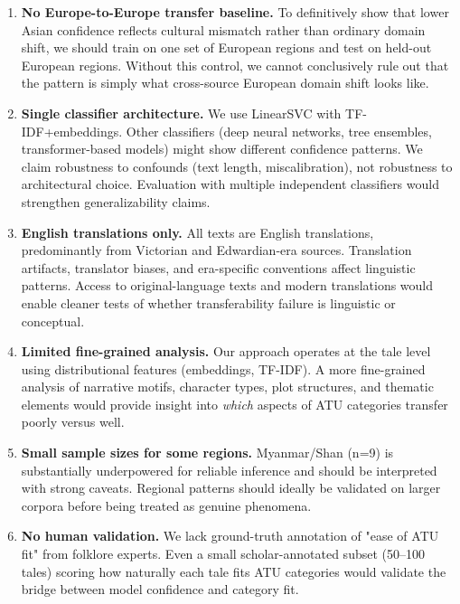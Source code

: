 \documentclass{article}
\begin{document}
\begin{enumerate}
\item \textbf{No Europe-to-Europe transfer baseline.} To definitively show that lower Asian confidence reflects cultural mismatch rather than ordinary domain shift, we should train on one set of European regions and test on held-out European regions. Without this control, we cannot conclusively rule out that the pattern is simply what cross-source European domain shift looks like.

\item \textbf{Single classifier architecture.} We use LinearSVC with TF-IDF+embeddings. Other classifiers (deep neural networks, tree ensembles, transformer-based models) might show different confidence patterns. We claim robustness to confounds (text length, miscalibration), not robustness to architectural choice. Evaluation with multiple independent classifiers would strengthen generalizability claims.

\item \textbf{English translations only.} All texts are English translations, predominantly from Victorian and Edwardian-era sources. Translation artifacts, translator biases, and era-specific conventions affect linguistic patterns. Access to original-language texts and modern translations would enable cleaner tests of whether transferability failure is linguistic or conceptual.

\item \textbf{Limited fine-grained analysis.} Our approach operates at the tale level using distributional features (embeddings, TF-IDF). A more fine-grained analysis of narrative motifs, character types, plot structures, and thematic elements would provide insight into \textit{which} aspects of ATU categories transfer poorly versus well.

\item \textbf{Small sample sizes for some regions.} Myanmar/Shan (n=9) is substantially underpowered for reliable inference and should be interpreted with strong caveats. Regional patterns should ideally be validated on larger corpora before being treated as genuine phenomena.

\item \textbf{No human validation.} We lack ground-truth annotation of "ease of ATU fit" from folklore experts. Even a small scholar-annotated subset (50--100 tales) scoring how naturally each tale fits ATU categories would validate the bridge between model confidence and category fit.


\end{enumerate}
\end{document}
